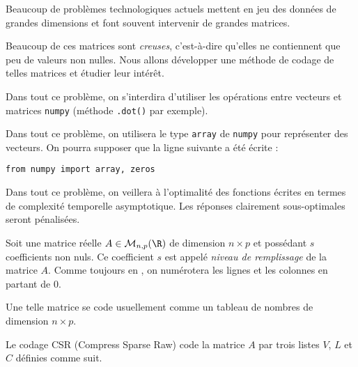 Beaucoup de problèmes technologiques actuels mettent en jeu des données de grandes dimensions et font souvent intervenir de grandes matrices.

Beaucoup de ces matrices sont \emph{creuses}, c'est-à-dire qu'elles ne contiennent que peu de valeurs non nulles. Nous allons développer une méthode de codage de telles matrices et étudier leur intérêt. 

Dans tout ce problème, on s'interdira d'utiliser les opérations entre vecteurs et matrices \texttt{numpy} (méthode \texttt{.dot()} par exemple). 

Dans tout ce problème, on utilisera le type \texttt{array} de \texttt{numpy} pour représenter des vecteurs. 
On pourra supposer que la ligne suivante a été écrite : 
\begin{verbatim}
from numpy import array, zeros
\end{verbatim}

Dans tout ce problème, on veillera à l'optimalité des fonctions écrites en termes de complexité temporelle asymptotique. Les réponses clairement sous-optimales seront pénalisées. 

\bigskip{}

Soit une matrice réelle $A \in \mathcal{M}_{n,p}(\R)$ de dimension $n \times p$ et possédant $s$ coefficients non nuls. Ce coefficient $s$ est appelé \emph{niveau de remplissage} de la matrice $A$. 
Comme toujours en \python{}, on numérotera les lignes et les colonnes en partant de $0$. 

Une telle matrice se code usuellement comme un tableau de nombres de dimension $n\times p$. 

Le codage CSR (Compress Sparse Raw) code la matrice $A$ par trois listes $V$, $L$ et $C$ définies comme suit.

